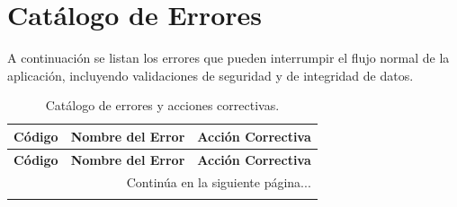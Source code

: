 
\chapter{Catálogo de Errores}
\label{anexo:errores}

A continuación se listan los errores que pueden interrumpir el flujo normal de la aplicación, incluyendo validaciones de seguridad y de integridad de datos.

\small
\begin{longtable}{|p{2cm}|p{6cm}|p{6cm}|}
    \caption{Catálogo de errores y acciones correctivas.} \label{tab:errores} \\
    
    \hline
    \rowcolor[HTML]{EFEFEF} 
    \textbf{Código} & \textbf{Nombre del Error} & \textbf{Acción Correctiva} \\ \hline
    \endfirsthead %
    
    \hline
    \rowcolor[HTML]{EFEFEF} 
    \textbf{Código} & \textbf{Nombre del Error} & \textbf{Acción Correctiva} \\ \hline
    \endhead %
    
    \hline
    \multicolumn{3}{r}{{Continúa en la siguiente página...}} \\
    \endfoot %
    
    \hline
    \endlastfoot %


\end{longtable}
